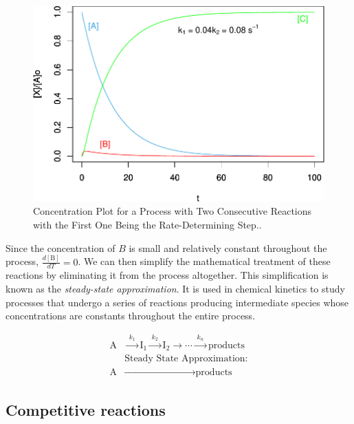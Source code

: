 \documentclass[
  9pt,
]{extbook}
\theoremstyle{definition}
\theoremstyle{definition}
\theoremstyle{definition}
\theoremstyle{remark}
\begin{document}
\begin{figure}

{\centering \includegraphics{pchem1_files/figure-latex/figk6-1} 

}

\caption{Concentration Plot for a Process with Two Consecutive Reactions with the First One Being the Rate-Determining Step..}\label{fig:figk6}
\end{figure}

Since the concentration of \(B\) is small and relatively constant throughout the process, \(\frac{d[\mathrm{B}]}{dT}=0\). We can then simplify the mathematical treatment of these reactions by eliminating it from the process altogether. This simplification is known as the \emph{steady-state approximation}. It is used in chemical kinetics to study processes that undergo a series of reactions producing intermediate species whose concentrations are constants throughout the entire process.

\begin{equation}
\begin{aligned}
\text{A} &\xrightarrow{\;k_1\;} \text{I}_1 \xrightarrow{\;k_2\;} \text{I}_2 \xrightarrow{\quad} \cdots \xrightarrow{\;k_n\;}\text{products} \\
& \text{Steady State Approximation:} \\
\text{A}&\xrightarrow{\qquad\qquad\qquad\qquad\quad\quad\;\;}\text{products}
\end{aligned}
\label{eq:kincomp8}
\end{equation}

\hypertarget{competitive-reactions}{%
\subsection{Competitive reactions}\label{competitive-reactions}}
\end{document}
